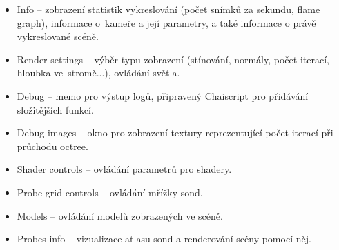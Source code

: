 \begin{itemize}
	\item Info -- zobrazení statistik vykreslování (počet snímků za sekundu, flame graph), informace o~kameře a její parametry, a také informace o právě vykreslované scéně.
	\item Render settings -- výběr typu zobrazení (stínování, normály, počet iterací, hloubka ve~stromě...), ovládání světla.
	\item Debug -- memo pro výstup logů, připravený Chaiscript pro přidávání složitějších funkcí.
	\item Debug images -- okno pro zobrazení textury reprezentující počet iterací při průchodu octree.
	\item Shader controls -- ovládání parametrů pro shadery.
	\item Probe grid controls -- ovládání mřížky sond.
	\item Models -- ovládání modelů zobrazených ve scéně.
	\item Probes info -- vizualizace atlasu sond a renderování scény pomocí něj.
\end{itemize}


